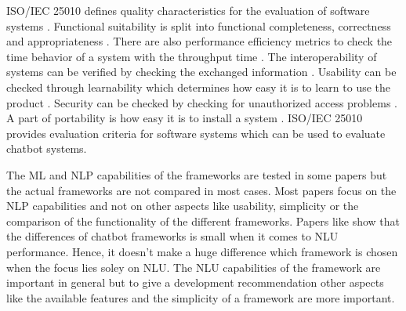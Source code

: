 


ISO/IEC 25010 defines quality characteristics for the evaluation of software systems \cite{iso25010}.
Functional suitability is split into functional completeness, correctness and appropriateness \cite{iso25010}.
There are also performance efficiency metrics to check the time behavior of a system with the throughput time \cite{iso25010}.
The interoperability of systems can be verified by checking the exchanged information \cite{iso25010}.
Usability can be checked through learnability which determines how easy it is to learn to use the product \cite{iso25010}.
Security can be checked by checking for unauthorized access problems \cite{iso25010}.
A part of portability is how easy it is to install a system \cite{iso25010}.
ISO/IEC 25010 provides evaluation criteria for software systems which can be used to evaluate chatbot systems.


The ML and NLP capabilities of the frameworks are tested in some papers but the actual frameworks are 
not compared in most cases. 
Most papers focus on the NLP capabilities and not on other aspects like usability, simplicity or the comparison of the 
functionality of the different frameworks.
Papers like \citet{braunEvaluatingNLU} show that the differences of chatbot frameworks is small when it comes to NLU performance.
Hence, it doesn't make a huge difference which framework is chosen when the focus lies soley on NLU.
The NLU capabilities of the framework are important in general but to give a development recommendation other aspects
like the available features and the simplicity of a framework are more important.



